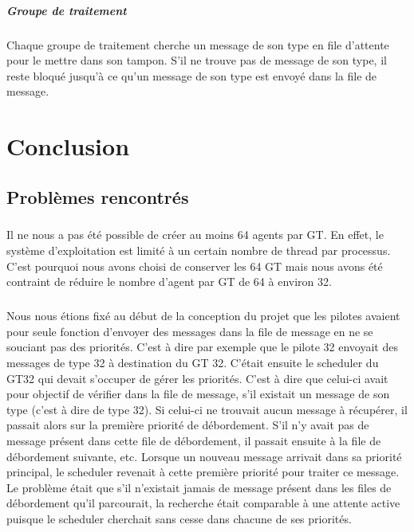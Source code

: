 \documentclass{report}
\begin{document}
		\paragraph{Groupe de traitement}
			Chaque groupe de traitement cherche un message de son type en file d'attente pour le mettre dans son tampon. S'il ne trouve pas de message de son type, il reste bloqué jusqu'à ce qu'un message de son type est envoyé dans la file de message.

\chapter{Conclusion}
	\section{Problèmes rencontrés}
		\paragraph{}
			Il ne nous a pas été possible de créer au moins 64 agents par GT. En effet, le système d'exploitation est limité à un certain nombre de thread par processus. C'est pourquoi nous avons choisi de conserver les 64 GT mais nous avons été contraint de réduire le nombre d'agent par GT de 64 à environ 32.
		\paragraph{}
			Nous nous étions fixé au début de la conception du projet que les pilotes avaient pour seule fonction d'envoyer des messages dans la file de message en ne se souciant pas des priorités. C'est à dire par exemple que le pilote 32 envoyait des messages de type 32 à destination du GT 32. C'était ensuite le scheduler du GT32 qui devait s'occuper de gérer les priorités. C'est à dire que celui-ci avait pour objectif de vérifier dans la file de message, s'il existait un message de son type (c'est à dire de type 32). Si celui-ci ne trouvait aucun message à récupérer, il passait alors sur la première priorité de débordement. S'il n'y avait pas de message présent dans cette file de débordement, il passait ensuite à la file de débordement suivante, etc. Lorsque un nouveau message arrivait dans sa priorité principal, le scheduler revenait à cette première priorité pour traiter ce message. Le problème était que s'il n'existait jamais de message présent dans les files de débordement qu'il parcourait, la recherche était comparable à une attente active puisque le scheduler cherchait sans cesse dans chacune de ses priorités. 
\end{document}
